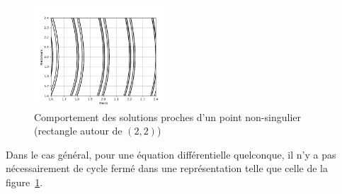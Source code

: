 \begin{figure}[htbp!]
	\centering
	\includegraphics[width=0.45\textwidth]{res/behaviour}
	\caption{Comportement des solutions proches d'un point non-singulier (rectangle autour de $(2, 2)$)}
	\label{fig:behaviour}
\end{figure}

Dans le cas général, pour une équation différentielle quelconque, il n'y a pas nécessairement de cycle fermé dans une représentation
telle que celle de la figure~\ref{fig:behaviour}.
